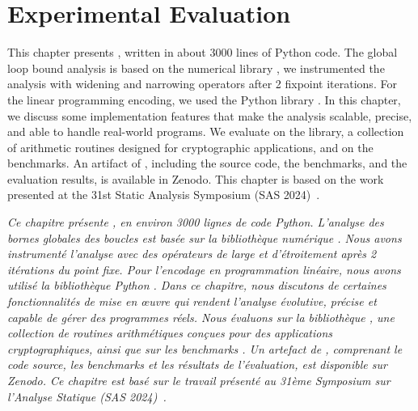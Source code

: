 \setchapterpreamble[u]{\margintoc}

\chapter{Experimental Evaluation}

This chapter presents \timesec\sidenotemark[\ref{sas24-eval:timesecurl}], written in about 3000 lines of Python code.
The global loop bound analysis is based on the numerical library \apron{} \cite{Jeannet2009}, we instrumented the analysis with widening and narrowing operators after 2 fixpoint iterations.
For the linear programming encoding, we used the Python library \scipy\sidenotemark[\ref{sas24-eval:scipy}].
In this chapter, we discuss some implementation features that make the analysis scalable, precise, and able to handle real-world programs.
We evaluate \timesec{} on the \bignum{} library, a collection of arithmetic routines designed for cryptographic applications, and on the \svcomp{} benchmarks.
An artifact of \timesec, including the source code, the benchmarks, and the evaluation results, is available in Zenodo\sidenotemark[\ref{sas24-eval:timeseczenodo}].
This chapter is based on the work presented at the 31st Static Analysis Symposium (SAS 2024)~\cite{Mazzucato2024c}.


\frenchdiv

\emph{Ce chapitre présente \timesec\sidenote{\label{sas24-eval:timesecurl}\timesecurl}, en environ 3000 lignes de code Python. L'analyse des bornes globales des boucles est basée sur la bibliothèque numérique \apron{} . Nous avons instrumenté l'analyse avec des opérateurs de large et d'étroitement après 2 itérations du point fixe. Pour l'encodage en programmation linéaire, nous avons utilisé la bibliothèque Python \scipy{}. Dans ce chapitre, nous discutons de certaines fonctionnalités de mise en œuvre qui rendent l'analyse évolutive, précise et capable de gérer des programmes réels. Nous évaluons \timesec{} sur la bibliothèque \bignum{}, une collection de routines arithmétiques conçues pour des applications cryptographiques, ainsi que sur les benchmarks \svcomp{}. Un artefact de \timesec, comprenant le code source, les benchmarks et les résultats de l'évaluation, est disponible sur Zenodo\sidenote{\label{sas24-eval:timeseczenodo}\timeseczenodo}. Ce chapitre est basé sur le travail présenté au 31ème Symposium sur l'Analyse Statique (SAS 2024)~.}

